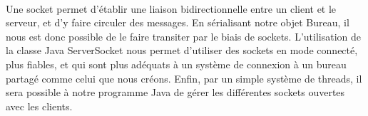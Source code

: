 \paragraph{}
Une socket permet d'établir une liaison bidirectionnelle entre un client et le serveur, et d'y faire circuler des messages. En sérialisant notre objet Bureau, il nous est donc possible de le faire transiter par le biais de sockets. L'utilisation de la classe Java ServerSocket nous permet d'utiliser des sockets en mode connecté, plus fiables, et qui sont plus adéquats à un système de connexion à un bureau partagé comme celui que nous créons. Enfin, par un simple système de threads, il sera possible à notre programme Java de gérer les différentes sockets ouvertes avec les clients.
